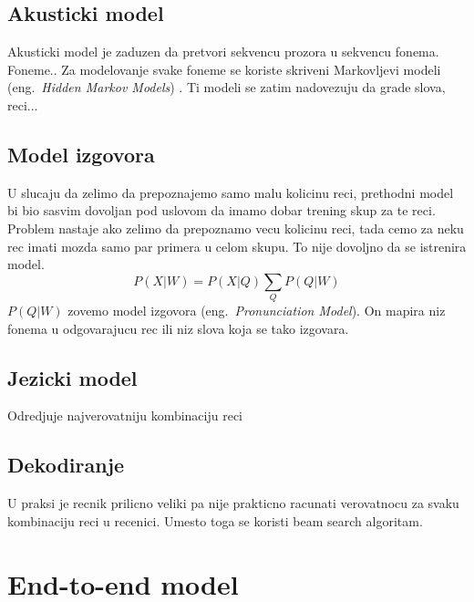 \documentclass[a4paper]{article}
\begin{document}
\subsection{Akusticki model}
Akusticki model je zaduzen da pretvori sekvencu prozora u sekvencu fonema. Foneme..
Za modelovanje svake foneme se koriste skriveni Markovljevi modeli (eng.~{\em Hidden Markov Models}) \cite{rabiner1989hmm}.
Ti modeli se zatim nadovezuju da grade slova, reci...

\subsection{Model izgovora}
U slucaju da zelimo da prepoznajemo samo malu kolicinu reci, prethodni model bi bio sasvim dovoljan pod uslovom da imamo dobar trening skup za te reci.
Problem nastaje ako zelimo da prepoznamo vecu kolicinu reci, tada cemo za neku rec imati mozda samo par primera u celom skupu.
To nije dovoljno da se istrenira model. 
\begin{equation*}
  P(X|W) = P(X|Q) \sum_{Q} P(Q|W)
\end{equation*}
$P(Q|W)$ zovemo model izgovora (eng.~{\em Pronunciation Model}).
On mapira niz fonema u odgovarajucu rec ili niz slova koja se tako izgovara.

\subsection{Jezicki model}
Odredjuje najverovatniju kombinaciju reci

\subsection{Dekodiranje}
U praksi je recnik prilicno veliki pa nije prakticno racunati verovatnocu za svaku kombinaciju reci u recenici.
Umesto toga se koristi beam search algoritam.

\section{End-to-end model}
\end{document}
